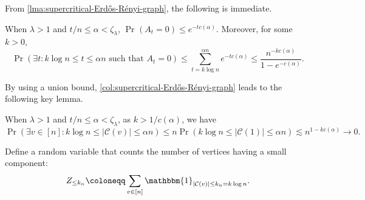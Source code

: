 From \autoref{lma:supercritical-Erdős-Rényi-graph}, the following is immediate.

\begin{corollary}\label{col:supercritical-Erdős-Rényi-graph}
	When \(\lambda > 1\) and \(t / n \leq \alpha < \zeta _\lambda \), \(\Pr_{}(A_t = 0) \leq e^{-t c(\alpha )} \). Moreover, for some \(k > 0\),
	\[
		\Pr_{}(\exists t\colon k \log n \leq t \leq \alpha n \text{ such that } A_t = 0)
		\leq \sum_{t = k \log n}^{\alpha n} e^{-t c(\alpha )}
		\leq \frac{n^{-k c(\alpha )}}{1 - e^{-c(\alpha )}}.
	\]
\end{corollary}

By using a union bound, \autoref{col:supercritical-Erdős-Rényi-graph} leads to the following key lemma.

\begin{lemma}\label{lma:intermediate-component-supercritical-Erdős-Rényi-graph}
	When \(\lambda > 1\) and \(t / n \leq \alpha < \zeta _{\lambda }\), as \(k > 1 / c(\alpha )\), we have
	\[
		\Pr_{}(\exists v \in [n] \colon k \log n \leq \lvert \mathcal{C} (v) \rvert \leq \alpha n)
		\leq n \Pr_{}(k \log n \leq \lvert \mathcal{C} (1) \rvert \leq \alpha n)
		\lesssim n^{1 - k c(\alpha )}
		\to 0.
	\]
\end{lemma}

Define a random variable that counts the number of vertices having a small component:
\[
	Z_{\leq k_n}
	\coloneqq \sum_{v \in [n]} \mathbbm{1}_{\lvert \mathcal{C} (v) \rvert \leq k_n = k \log n}.
\]

